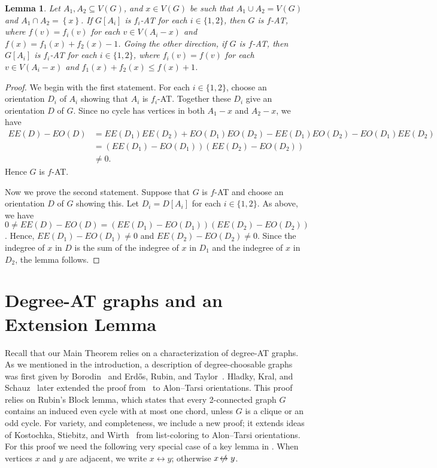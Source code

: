 \documentclass[12pt]{article}
\theoremstyle{plain}
\newtheorem{lem}[thm]{Lemma}
\theoremstyle{definition}
\theoremstyle{remark}
\newcommand{\set}[1]{\left\{ #1 \right\}}
\def\erdos{Erd\H{o}s}
\def\adj{\leftrightarrow}
\def\nonadj{\not\!\leftrightarrow}
\begin{document}
\begin{lem}\label{CutvertexPatch}
Let $A_1, A_2 \subseteq V(G)$, and $x\in V(G)$ be such that $A_1\cup A_2=V(G)$ and $A_1 \cap
A_2 = \set{x}$.  If $G[A_i]$ is $f_i$-AT for each $i \in \{1,2\}$, then $G$ is
$f$-AT, where $f(v) = f_i(v)$ for each $v \in V(A_i-x)$ and $f(x) = f_1(x) + f_2(x)
- 1$.  Going the other direction, if $G$ is $f$-AT, then $G[A_i]$ is $f_i$-AT
for each $i \in \{1,2\}$, where $f_i(v) = f(v)$ for each $v \in V(A_i-x)$ and
$f_1(x) + f_2(x) \le f(x) + 1$.
\end{lem}
\begin{proof}
We begin with the first statement.
For each $i \in \{1,2\}$, choose an orientation $D_i$ of $A_i$ showing that $A_i$
is $f_i$-AT.  Together these $D_i$ give an orientation $D$ of $G$. Since no cycle
has vertices in both $A_1-x$ and $A_2-x$, we have
\begin{align*}
EE(D) - EO(D) &= EE(D_1)EE(D_2) + EO(D_1)EO(D_2) - EE(D_1)EO(D_2) - EO(D_1)EE(D_2) \\
&= (EE(D_1) - EO(D_1))(EE(D_2) - EO(D_2)) \\
&\ne 0.
\end{align*}
Hence $G$ is $f$-AT.
	
Now we prove the second statement.  Suppose that $G$ is $f$-AT and choose an
orientation $D$ of $G$ showing this. 
Let $D_i = D[A_i]$ for each $i \in \{1,2\}$.  As above, we have $0 \ne
EE(D) - EO(D) = (EE(D_1) - EO(D_1))(EE(D_2) - EO(D_2))$. Hence, $EE(D_1) -
EO(D_1) \ne 0$ and $EE(D_2) - EO(D_2) \ne 0$.  Since the indegree of $x$ in
$D$ is the sum of the indegree of $x$ in $D_1$ and the indegree of $x$ in
$D_2$, the lemma follows.
\end{proof}

\section{Degree-AT graphs and an Extension Lemma}
Recall that our Main Theorem relies on a characterization of degree-AT graphs. 
As we mentioned in the introduction, a description of degree-choosable graphs
was first given by Borodin~\cite{borodin1977criterion} and \erdos, Rubin, and
Taylor~\cite{ERT}.  Hladky, Kral, and Schauz~\cite{HKS} later extended the
proof from~\cite{ERT} to Alon--Tarsi orientations.  This proof relies on
Rubin's Block lemma, which states that every 2-connected graph $G$ contains an
induced even cycle with at most one chord, unless $G$ is a clique or an odd
cycle.  For variety, and completeness, we include a new proof; it extends ideas
of Kostochka, Stiebitz, and Wirth~\cite{KSW} from list-coloring to Alon--Tarsi
orientations.  For this proof we need the following very special case of a key
lemma in \cite{OreVizing}.  When vertices $x$ and $y$ are adjacent, we write
$x\adj y$; otherwise $x\nonadj y$.
\end{document}
